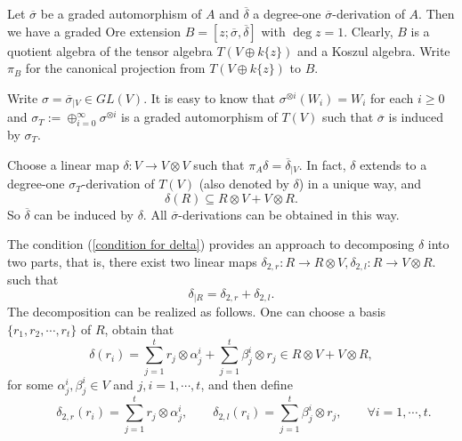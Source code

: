 \documentclass[a4paper,10pt]{amsart}
\theoremstyle{definition}
\numberwithin{equation}{section}
\begin{document}
Let $\overline{\sigma}$ be a graded automorphism of $A$ and $\overline{\delta}$ a degree-one $\overline{\sigma}$-derivation of $A$. Then we have a graded Ore extension $B=[z;\overline{\sigma},\overline{\delta}]$ with $\deg z=1$. Clearly, $B$ is a quotient algebra of the tensor algebra $T(V\oplus k\{z\})$ and a Koszul algebra. Write $\pi_B$ for the canonical projection from $T(V\oplus k\{z\})$ to $B$.

Write $\sigma=\overline{\sigma}_{\mid V}\in GL(V)$. It is easy to know that $\sigma^{\otimes i}(W_i)=W_i$ for each $i\geq 0$  and $\sigma_{T}:=\oplus_{i=0}^{\infty}\sigma^{\otimes i}$ is a graded automorphism of $T(V)$ such that $\overline{\sigma}$ is induced by $\sigma_{T}$.

Choose a linear map $\delta:V\to V\otimes V$ such that $\pi_A\delta=\overline{\delta}_{\mid V}$. In fact, $\delta$ extends to a degree-one $\sigma_T$-derivation of $T(V)$ (also denoted by $\delta$) in a unique way, and
\begin{equation}\label{condition for delta}
\delta(R)\subseteq R\otimes V+V\otimes R.
\end{equation}
So $\overline{\delta}$ can be induced by $\delta$. All $\overline{\sigma}$-derivations can be obtained in this way.

The condition (\ref{condition for delta}) provides an approach to decomposing $\delta$ into two parts, that is, there exist two linear maps
$\delta_{2,r}: R\to R\otimes V,\delta_{2,l}: R\to V\otimes R.
$ such that
\begin{equation}\label{definition of delta_2}
\delta_{\mid R}=\delta_{2,r}+\delta_{2,l}.
\end{equation}
The decomposition can be realized as follows. One can choose a basis $\{r_1,r_2,\cdots,r_t\}$ of $R$, obtain that
\begin{equation}\label{decomposition of delta}
\delta(r_i)=\sum_{j=1}^t r_j\otimes \alpha^{i}_{j}+\sum_{j=1}^t \beta^{i}_{j}\otimes r_j\in R\otimes V+V\otimes R,
\end{equation}
for some $\alpha^{i}_j,\beta^{i}_j\in V$ and $j,i=1,\cdots,t$, and then define
\begin{equation*}%
\qquad\delta_{2,r}(r_i)=\sum_{j=1}^t r_j\otimes \alpha^{i}_{j},\qquad
\delta_{2,l}(r_i)=\sum_{j=1}^t \beta^{i}_{j}\otimes r_j, \qquad \forall i=1,\cdots,t.
\end{equation*}
\end{document}
